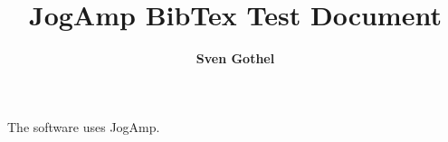 \documentclass[11pt]{article}
\begin{document}
\Large
\title{\bf JogAmp BibTex Test Document}

\author{{\bf Sven Gothel}}


\maketitle

The software uses JogAmp\cite{jogamp10}.



\end{document}

